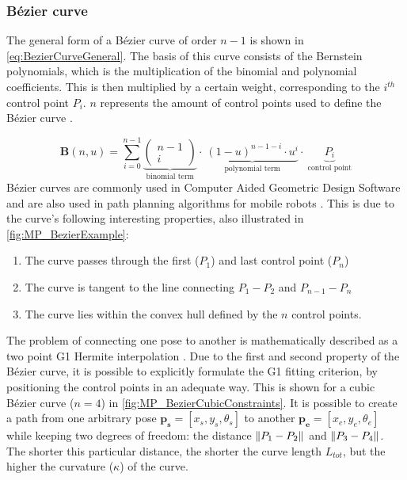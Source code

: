 \subsubsection{Bézier curve}
The general form of a Bézier curve of order $n-1$ is shown in \cref{eq:BezierCurveGeneral}. The basis of this curve consists of the Bernstein polynomials, which is the multiplication of the binomial and polynomial coefficients. This is then multiplied by a certain weight, corresponding to the $i^{th}$ control point $P_i$. $n$ represents the amount of control points used to define the Bézier curve \cite{Sederberg2016}.

\begin{equation} \label{eq:BezierCurveGeneral}
\bm{B}(n,u) = \sum_{i=0}^{n-1}
\underbrace{ \begin{pmatrix} n-1 \\ i \end{pmatrix}}_\text{binomial term} \cdot~
\underbrace{(1-u)^{n-1-i} \cdot u^i}_\text{polynomial term}
\cdot~\underbrace{ P_i}_\text{control point}
\end{equation}
Bézier curves are commonly used in Computer Aided Geometric Design Software and are also used in path planning algorithms for mobile robots \cite{PanEtAl2012,ChoiEtAl2008,ChoiEtAl2010}. This is due to the curve’s following interesting properties, also illustrated in \cref{fig:MP_BezierExample}:
\vspace{1em}
\begin{enumerate}
\item The curve passes through the first ($P_1$) and last control point ($P_n$)
\item The curve is tangent to the line connecting $P_1-P_2$ and $P_{n-1}-P_n$
\item The curve lies within the convex hull defined by the $n$ control points.
\end{enumerate}
\vspace{1em}

The problem of connecting one pose to another is mathematically described as a two point G1 Hermite interpolation \cite{WaltonMeek2009}. Due to the first and second property of the Bézier curve, it is possible to explicitly formulate the G1 fitting criterion, by positioning the control points in an adequate way. This is shown for a cubic Bézier curve ($n=4$) in \cref{fig:MP_BezierCubicConstraints}. It is possible to create a path from one arbitrary pose $\bm{p_s}=[x_s, y_s, \theta_s]$ to another $\bm{p_e}=[x_e, y_e, \theta_e]$ while keeping two degrees of freedom: the distance $\left\lVert P_1-P_2 \right\rVert$ and $\left\lVert P_3-P_4 \right\rVert$. The shorter this particular distance, the shorter the curve length $L_{tot}$, but the higher the curvature ($\kappa$) of the curve. 

